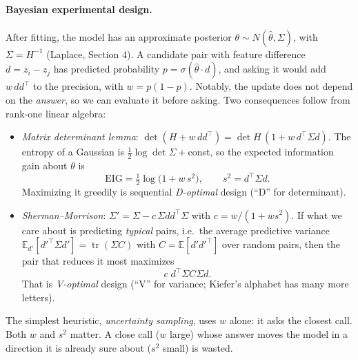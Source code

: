 \documentclass[11pt]{article}
\theoremstyle{definition}
\theoremstyle{plain}
\theoremstyle{remark}
\newcommand{\E}{\mathbb{E}}
\renewcommand{\_}{\oldunderscore\allowbreak}
\begin{document}
\paragraph{Bayesian experimental design.}
After fitting, the model has an approximate posterior $\theta\sim N(\hat\theta,\Sigma)$, with $\Sigma=H^{-1}$ (Laplace, Section 4). A candidate pair with
feature difference $d=z_i-z_j$ has predicted probability $p=\sigma(\hat\theta\cdot d)$, and asking it would add $w\,dd^\top$ to the precision, with $w=p(1-p)$.
Notably, the update does not depend on the \emph{answer}, so we can evaluate it before asking. Two consequences follow from rank-one linear algebra:
\begin{itemize}[nosep]
\item \emph{Matrix determinant lemma}: $\det(H+w\,dd^\top)=\det H\,(1+w\,d^\top\Sigma d)$. The entropy of a Gaussian is $\frac12\log\det\Sigma+$const,
  so the expected information gain about $\theta$ is
  \[ \mathrm{EIG}=\tfrac12\log\bigl(1+w\,s^2\bigr),\qquad s^2=d^\top\Sigma d. \]
  Maximizing it greedily is sequential \emph{D-optimal} design (``D'' for determinant).
\item \emph{Sherman--Morrison}: $\Sigma'=\Sigma-c\,\Sigma dd^\top\Sigma$ with $c=w/(1+ws^2)$. If what we care about is predicting
  \emph{typical} pairs, i.e.\ the average predictive variance $\E_{d'}[d'^\top\Sigma d']=\operatorname{tr}(\Sigma C)$ with $C=\E[d'd'^\top]$ over random pairs, then the pair
  that reduces it most maximizes
  \[ c\;d^\top\Sigma C\Sigma d. \]
  That is \emph{V-optimal} design (``V'' for variance; Kiefer's alphabet has many more letters).
\end{itemize}
The simplest heuristic, \emph{uncertainty sampling}, uses $w$ alone: it asks the closest call. Both $w$ and $s^2$ matter. A close call ($w$
large) whose answer moves the model in a direction it is already sure about ($s^2$ small) is wasted.
\end{document}
